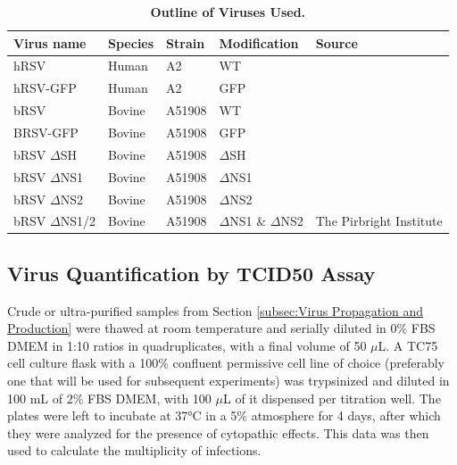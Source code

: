 \begin{table}
\centering
\begin{tabular}{lllll}
\toprule
{\textbf{Virus name}} &
  {\textbf{Species}} &
  { \textbf{Strain}} &
  { \textbf{Modification}} &
  { \textbf{Source}} \\ \midrule
hRSV      & Human  & A2     & WT   &  \\ 
hRSV-GFP  & Human  & A2     & GFP  &  \\ 
bRSV      & Bovine & A51908 & WT   &  \\ 
BRSV-GFP  & Bovine & A51908 & GFP  &  \\ 
bRSV \(\Delta\)SH  & Bovine & A51908 & \(\Delta\)SH  &  \\ 
bRSV \(\Delta\)NS1 & Bovine & A51908 & \(\Delta\)NS1 &  \\ 
bRSV \(\Delta\)NS2 & Bovine & A51908 & \(\Delta\)NS2 &  \\ 
bRSV \(\Delta\)NS1/2 &
  Bovine &
  A51908 &
  \(\Delta\)NS1 \& \(\Delta\)NS2 &
  \multirow{-8}{*}{The Pirbright Institute} \\ \bottomrule
\end{tabular}
\caption[Outline of Viruses Used.]{\textbf{Outline of Viruses Used.}}
\label{tab:Outline of Viruses Used table}
\end{table}

\subsection{Virus Quantification by TCID50 Assay} \label{subsec:Virus Quantification by TCID50 Assay}
Crude or ultra-purified samples from Section \ref{subsec:Virus Propagation and Production} were thawed at room temperature and serially diluted in 0\% FBS DMEM in 1:10 ratios in quadruplicates, with a final volume of 50 $\mu$L. A TC75 cell culture flask with a 100\% confluent permissive cell line of choice (preferably one that will be used for subsequent experiments) was trypsinized and diluted in 100 mL of 2\% FBS DMEM, with 100 $\mu$L of it dispensed per titration well. The plates were left to incubate at 37°C in a 5\%  atmosphere for 4 days, after which they were analyzed for the presence of cytopathic effects. This data was then used to calculate the multiplicity of infections.

